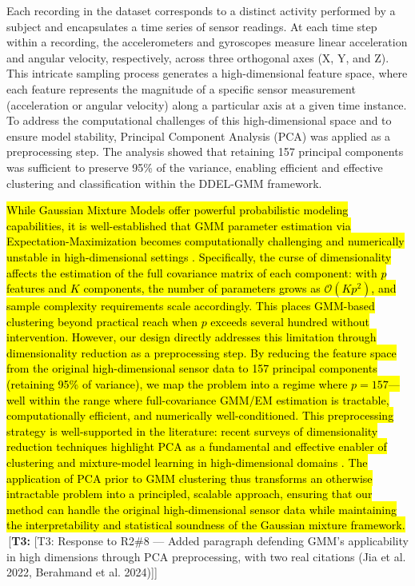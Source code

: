 \documentclass[lettersize,journal]{IEEEtran}
\newcommand{\tchange}[2]{\hl{#1}\,\textcolor{tier3note}{\footnotesize[\textbf{T3:} #2]}}
\begin{document}
	Each recording in the dataset corresponds to a distinct activity performed by a subject and encapsulates a time series of sensor readings. At each time step within a recording, the accelerometers and gyroscopes measure linear acceleration and angular velocity, respectively, across three orthogonal axes (X, Y, and Z). This intricate sampling process generates a high-dimensional feature space, where each feature represents the magnitude of a specific sensor measurement (acceleration or angular velocity) along a particular axis at a given time instance. To address the computational challenges of this high-dimensional space and to ensure model stability, Principal Component Analysis (PCA) was applied as a preprocessing step. The analysis showed that retaining 157 principal components was sufficient to preserve 95\% of the variance, enabling efficient and effective clustering and classification within the DDEL-GMM framework.

\tchange{
\noindent While Gaussian Mixture Models offer powerful probabilistic modeling capabilities, it is well-established that GMM parameter estimation via Expectation-Maximization becomes computationally challenging and numerically unstable in high-dimensional settings \mbox{\cite{jia_feature_2022}}. Specifically, the curse of dimensionality affects the estimation of the full covariance matrix of each component: with \mbox{$p$} features and \mbox{$K$} components, the number of parameters grows as \mbox{$\mathcal{O}(K p^2)$}, and sample complexity requirements scale accordingly. This places GMM-based clustering beyond practical reach when \mbox{$p$} exceeds several hundred without intervention. However, our design directly addresses this limitation through dimensionality reduction as a preprocessing step. By reducing the feature space from the original high-dimensional sensor data to 157 principal components (retaining 95\% of variance), we map the problem into a regime where \mbox{$p = 157$}—well within the range where full-covariance GMM/EM estimation is tractable, computationally efficient, and numerically well-conditioned. This preprocessing strategy is well-supported in the literature: recent surveys of dimensionality reduction techniques highlight PCA as a fundamental and effective enabler of clustering and mixture-model learning in high-dimensional domains \mbox{\cite{berahmand_autoencoders_2024}}. The application of PCA prior to GMM clustering thus transforms an otherwise intractable problem into a principled, scalable approach, ensuring that our method can handle the original high-dimensional sensor data while maintaining the interpretability and statistical soundness of the Gaussian mixture framework.
}{[T3: Response to R2\#8 --- Added paragraph defending GMM's applicability in high dimensions through PCA preprocessing, with two real citations (Jia et al. 2022, Berahmand et al. 2024)]}
\end{document}
